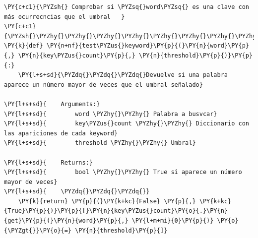     \begin{tcolorbox}[breakable, size=fbox, boxrule=1pt, pad at break*=1mm,colback=cellbackground, colframe=cellborder]
\begin{Verbatim}[commandchars=\\\{\}]
\PY{c+c1}{\PYZsh{} Comprobar si \PYZsq{}word\PYZsq{} es una clave con más ocurrecncias que el umbral   }
\PY{c+c1}{\PYZsh{}\PYZhy{}\PYZhy{}\PYZhy{}\PYZhy{}\PYZhy{}\PYZhy{}\PYZhy{}\PYZhy{}\PYZhy{}\PYZhy{}\PYZhy{}\PYZhy{}\PYZhy{}\PYZhy{}\PYZhy{}\PYZhy{}\PYZhy{}\PYZhy{}\PYZhy{}\PYZhy{}\PYZhy{}\PYZhy{}\PYZhy{}\PYZhy{}\PYZhy{}\PYZhy{}\PYZhy{}\PYZhy{}\PYZhy{}\PYZhy{}\PYZhy{}\PYZhy{}\PYZhy{}\PYZhy{}\PYZhy{}\PYZhy{}\PYZhy{}\PYZhy{}\PYZhy{}\PYZhy{}\PYZhy{}\PYZhy{}\PYZhy{}\PYZhy{}\PYZhy{}\PYZhy{}\PYZhy{}\PYZhy{}\PYZhy{}\PYZhy{}\PYZhy{}\PYZhy{}\PYZhy{}\PYZhy{}\PYZhy{}\PYZhy{}\PYZhy{}\PYZhy{}\PYZhy{}\PYZhy{}\PYZhy{}\PYZhy{}\PYZhy{}\PYZhy{}\PYZhy{}\PYZhy{}\PYZhy{}\PYZhy{}\PYZhy{}\PYZhy{}\PYZhy{}\PYZhy{}\PYZhy{}\PYZhy{}\PYZhy{}\PYZhy{}\PYZhy{}\PYZhy{}\PYZhy{}\PYZhy{}\PYZhy{}\PYZhy{}}
\PY{k}{def} \PY{n+nf}{test\PYZus{}keyword}\PY{p}{(}\PY{n}{word}\PY{p}{,} \PY{n}{key\PYZus{}count}\PY{p}{,} \PY{n}{threshold}\PY{p}{)}\PY{p}{:}
    \PY{l+s+sd}{\PYZdq{}\PYZdq{}\PYZdq{}Devuelve si una palabra aparece un número mayor de veces que el umbral señalado}

\PY{l+s+sd}{    Arguments:}
\PY{l+s+sd}{        word \PYZhy{}\PYZhy{} Palabra a busvcar}
\PY{l+s+sd}{        key\PYZus{}count \PYZhy{}\PYZhy{} Diccionario con las apariciones de cada keyword}
\PY{l+s+sd}{        threshold \PYZhy{}\PYZhy{} Umbral}

\PY{l+s+sd}{    Returns:}
\PY{l+s+sd}{        bool \PYZhy{}\PYZhy{} True si aparece un número mayor de veces}
\PY{l+s+sd}{    \PYZdq{}\PYZdq{}\PYZdq{}}
    \PY{k}{return} \PY{p}{(}\PY{k+kc}{False} \PY{p}{,} \PY{k+kc}{True}\PY{p}{)}\PY{p}{[}\PY{n}{key\PYZus{}count}\PY{o}{.}\PY{n}{get}\PY{p}{(}\PY{n}{word}\PY{p}{,} \PY{l+m+mi}{0}\PY{p}{)} \PY{o}{\PYZgt{}}\PY{o}{=} \PY{n}{threshold}\PY{p}{]} 
\end{Verbatim}
\end{tcolorbox}


